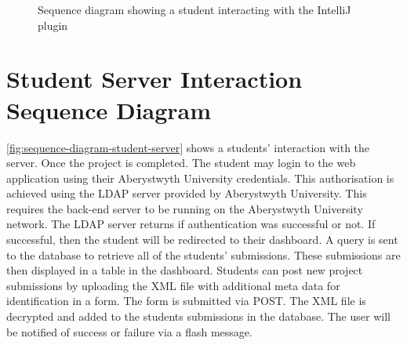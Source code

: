 \begin{figure}[H]
  \centering
  \caption[Student-plugin sequence diagram]{Sequence diagram showing a student interacting with the IntelliJ plugin}
  \label{fig:sequence-diagram-student-plugin}
\end{figure}

\vspace*{\fill}

\newpage

\section{Student Server Interaction Sequence Diagram}
\autoref{fig:sequence-diagram-student-server} shows a students' interaction with the server. Once the project is completed. The student may login to the web application using their Aberystwyth University credentials. This authorisation is achieved using the LDAP server provided by Aberystwyth University. This requires the back-end server to be running on the Aberystwyth University network. The LDAP server returns if authentication was successful or not. If successful, then the student will be redirected to their dashboard. A query is sent to the database to retrieve all of the students' submissions. These submissions are then displayed in a table in the dashboard. Students can post new project submissions by uploading the XML file with additional meta data for identification in a form. The form is submitted via POST. The XML file is decrypted and added to the students submissions in the database. The user will be notified of success or failure via a flash message.

